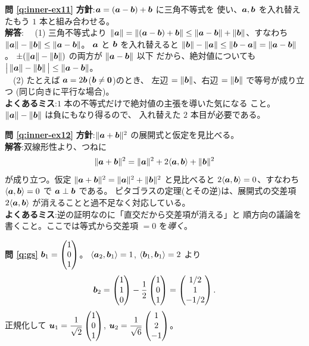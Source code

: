 \bigskip
\noindent\textbf{問 \ref{q:inner-ex11}}\quad
\textbf{方針}:$\bm{a} = (\bm{a} - \bm{b}) + \bm{b}$ に三角不等式を
使い、$\bm{a}, \bm{b}$ を入れ替えたもう $1$ 本と組み合わせる。\\
\textbf{解答}:
　(1) 三角不等式より
$\|\bm{a}\| = \|(\bm{a} - \bm{b}) + \bm{b}\|
\le \|\bm{a} - \bm{b}\| + \|\bm{b}\|$、すなわち
$\|\bm{a}\| - \|\bm{b}\| \le \|\bm{a} - \bm{b}\|$。
$\bm{a}$ と $\bm{b}$ を入れ替えると
$\|\bm{b}\| - \|\bm{a}\| \le \|\bm{b} - \bm{a}\| = \|\bm{a} - \bm{b}\|$。
$\pm(\|\bm{a}\| - \|\bm{b}\|)$ の両方が $\|\bm{a} - \bm{b}\|$ 以下
だから、絶対値についても
$\bigl|\,\|\bm{a}\| - \|\bm{b}\|\,\bigr| \le \|\bm{a} - \bm{b}\|$。\\
　(2) たとえば $\bm{a} = 2\bm{b}$($\bm{b} \neq \bm{0}$)のとき、
左辺 $= \|\bm{b}\|$、右辺 $= \|\bm{b}\|$ で等号が成り立つ
(同じ向きに平行な場合)。\\
\textbf{よくあるミス}:$1$ 本の不等式だけで絶対値の主張を導いた気になる
こと。$\|\bm{a}\| - \|\bm{b}\|$ は負にもなり得るので、
入れ替えた $2$ 本目が必要である。

\bigskip
\noindent\textbf{問 \ref{q:inner-ex12}}\quad
\textbf{方針}:$\|\bm{a} + \bm{b}\|^2$ の展開式と仮定を見比べる。\\
\textbf{解答}:双線形性より、つねに
\[
\|\bm{a} + \bm{b}\|^2 = \|\bm{a}\|^2 + 2\langle \bm{a}, \bm{b} \rangle
+ \|\bm{b}\|^2
\]
が成り立つ。仮定 $\|\bm{a} + \bm{b}\|^2 = \|\bm{a}\|^2 + \|\bm{b}\|^2$
と見比べると $2\langle \bm{a}, \bm{b} \rangle = 0$、すなわち
$\langle \bm{a}, \bm{b} \rangle = 0$ で $\bm{a} \perp \bm{b}$ である。
ピタゴラスの定理(とその逆)は、展開式の交差項
$2\langle \bm{a}, \bm{b} \rangle$ が消えることと過不足なく対応している。\\
\textbf{よくあるミス}:逆の証明なのに「直交だから交差項が消える」と
順方向の議論を書くこと。ここでは等式から交差項 $= 0$ を\emph{導く}。

\bigskip
\noindent\textbf{問 \ref{q:gs}}\quad
$\bm{b}_1 = \begin{pmatrix}1 \\ 0 \\ 1\end{pmatrix}$。
$\langle \bm{a}_2, \bm{b}_1 \rangle = 1$,
$\langle \bm{b}_1, \bm{b}_1 \rangle = 2$ より
\[
\bm{b}_2 = \begin{pmatrix}1 \\ 1 \\ 0\end{pmatrix} - \frac{1}{2}\begin{pmatrix}1 \\ 0 \\ 1\end{pmatrix}
= \begin{pmatrix}1/2 \\ 1 \\ -1/2\end{pmatrix}.
\]
正規化して
$\bm{u}_1 = \dfrac{1}{\sqrt{2}}\begin{pmatrix}1 \\ 0 \\ 1\end{pmatrix}$,
$\bm{u}_2 = \dfrac{1}{\sqrt{6}}\begin{pmatrix}1 \\ 2 \\ -1\end{pmatrix}$。

